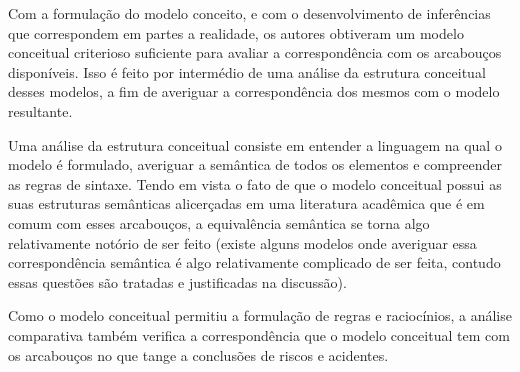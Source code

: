 Com a formulação do modelo conceito, e com o desenvolvimento de inferências que correspondem em partes a realidade, os autores obtiveram um modelo conceitual criterioso suficiente para avaliar a correspondência com os arcabouços disponíveis. Isso é feito por intermédio de uma análise da estrutura conceitual desses modelos, a fim de averiguar a correspondência dos mesmos com o modelo resultante.

Uma análise da estrutura conceitual consiste em entender a linguagem na qual o modelo é formulado, averiguar a semântica de todos os elementos e compreender as regras de sintaxe. Tendo em vista o fato de que o modelo conceitual possui as suas estruturas semânticas alicerçadas em uma literatura acadêmica que é em comum com esses arcabouços, a equivalência semântica se torna algo relativamente notório de ser feito (existe alguns modelos onde averiguar essa correspondência semântica é algo relativamente complicado de ser feita, contudo essas questões são tratadas e justificadas na discussão).

Como o modelo conceitual permitiu a formulação de regras e raciocínios, a análise comparativa também verifica a correspondência que o modelo conceitual tem com os arcabouços no que tange a conclusões de riscos e acidentes.
